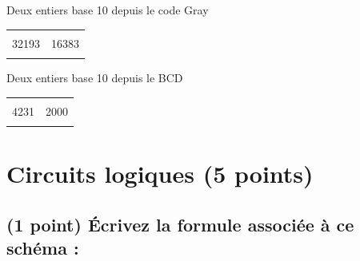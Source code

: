 \documentclass[11pt,a4paper]{article}
\begin{document}
\smallskip

\begin{table}[!ht]
  \centering
  \begin{minipage}{0.50\textwidth}
    \centering

Deux entiers base 10 depuis le code Gray

\medskip

\begin{tabular}{| C{3cm} | C{3cm} |}
\hline
\phantom{42} & \phantom{42} \\
32193 & 16383 \\
\phantom{42} & \phantom{42} \\
\hline
\end{tabular}

  \end{minipage}
  \hfillx
  \begin{minipage}{0.50\textwidth}
    \centering

Deux entiers base 10 depuis le BCD

\medskip

\begin{tabular}{| C{3cm} | C{3cm} |}
\hline
\phantom{42} & \phantom{42} \\
4231 & 2000 \\
\phantom{42} & \phantom{42} \\
\hline
\end{tabular}

  \end{minipage}
\end{table}

\bigskip



\section{Circuits logiques (5 points)}

\subsection{(1 point) \'Ecrivez la formule associée à ce schéma : }

\smallskip
\end{document}
